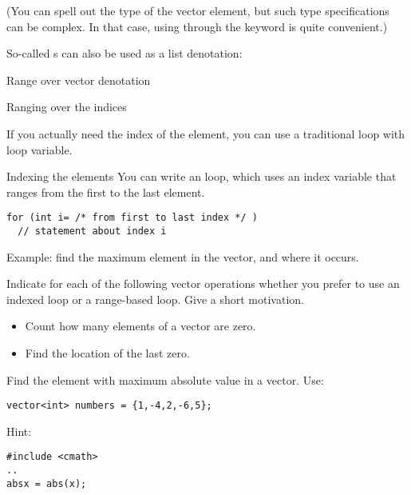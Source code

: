 (You can spell out the type of the vector element, but such type
specifications can be complex.
In that case, using 
through the  keyword
is quite convenient.)

So-called s
can also be used as a list denotation:

\begin{block}{Range over vector denotation}
  \label{sl:range-denote}
\end{block}

 {Ranging over the indices}

If you actually need the index of the element, you can use a
traditional  loop with loop variable.

\begin{block}{Indexing the elements}
  \label{sl:index-range}
  You can write an  loop, which uses an
  index variable that ranges from the first to the last element.
\begin{lstlisting}
for (int i= /* from first to last index */ )
  // statement about index i
\end{lstlisting}
Example: find the maximum element in the vector, and where it occurs.
%
\end{block}

\begin{exercise}
  \label{ex:range-for}
  Indicate for each of the following vector operations whether you
  prefer to use an indexed loop or a range-based loop. Give a short
  motivation.
  \begin{itemize}
  \item Count how many elements of a vector are zero.
  \item Find the location of the last zero.
  \end{itemize}
\end{exercise}

\begin{exercise}
  \label{ex:array-max}
  Find the element with maximum absolute value in a vector. Use:
\begin{lstlisting}
vector<int> numbers = {1,-4,2,-6,5};
\end{lstlisting}

Hint:
\begin{lstlisting}
#include <cmath>
..
absx = abs(x);
\end{lstlisting}
\end{exercise}

